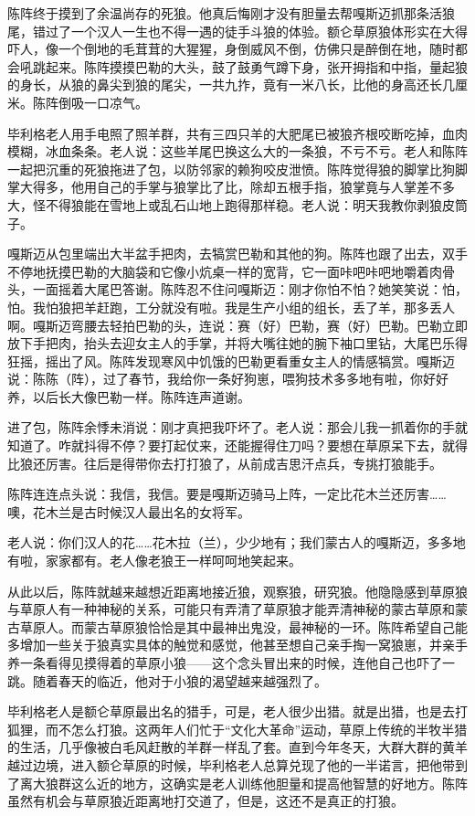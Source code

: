 \par 陈阵终于摸到了余温尚存的死狼。他真后悔刚才没有胆量去帮嘎斯迈抓那条活狼尾，错过了一个汉人一生也不得一遇的徒手斗狼的体验。额仑草原狼体形实在大得吓人，像一个倒地的毛茸茸的大猩猩，身倒威风不倒，仿佛只是醉倒在地，随时都会吼跳起来。陈阵摸摸巴勒的大头，鼓了鼓勇气蹲下身，张开拇指和中指，量起狼的身长，从狼的鼻尖到狼的尾尖，一共九拃，竟有一米八长，比他的身高还长几厘米。陈阵倒吸一口凉气。
\par 毕利格老人用手电照了照羊群，共有三四只羊的大肥尾已被狼齐根咬断吃掉，血肉模糊，冰血条条。老人说：这些羊尾巴换这么大的一条狼，不亏不亏。老人和陈阵一起把沉重的死狼拖进了包，以防邻家的赖狗咬皮泄愤。陈阵觉得狼的脚掌比狗脚掌大得多，他用自己的手掌与狼掌比了比，除却五根手指，狼掌竟与人掌差不多大，怪不得狼能在雪地上或乱石山地上跑得那样稳。老人说：明天我教你剥狼皮筒子。
\par 嘎斯迈从包里端出大半盆手把肉，去犒赏巴勒和其他的狗。陈阵也跟了出去，双手不停地抚摸巴勒的大脑袋和它像小炕桌一样的宽背，它一面咔吧咔吧地嚼着肉骨头，一面摇着大尾巴答谢。陈阵忍不住问嘎斯迈：刚才你怕不怕？她笑笑说：怕，怕。我怕狼把羊赶跑，工分就没有啦。我是生产小组的组长，丢了羊，那多丢人啊。嘎斯迈弯腰去轻拍巴勒的头，连说：赛（好）巴勒，赛（好）巴勒。巴勒立即放下手把肉，抬头去迎女主人的手掌，并将大嘴往她的腕下袖口里钻，大尾巴乐得狂摇，摇出了风。陈阵发现寒风中饥饿的巴勒更看重女主人的情感犒赏。嘎斯迈说：陈陈（阵），过了春节，我给你一条好狗崽，喂狗技术多多地有啦，你好好养，以后长大像巴勒一样。陈阵连声道谢。
\par 进了包，陈阵余悸未消说：刚才真把我吓坏了。老人说：那会儿我一抓着你的手就知道了。咋就抖得不停？要打起仗来，还能握得住刀吗？要想在草原呆下去，就得比狼还厉害。往后是得带你去打打狼了，从前成吉思汗点兵，专挑打狼能手。
\par 陈阵连连点头说：我信，我信。要是嘎斯迈骑马上阵，一定比花木兰还厉害……噢，花木兰是古时候汉人最出名的女将军。
\par 老人说：你们汉人的花……花木拉（兰），少少地有；我们蒙古人的嘎斯迈，多多地有啦，家家都有。老人像老狼王一样呵呵地笑起来。
\par 从此以后，陈阵就越来越想近距离地接近狼，观察狼，研究狼。他隐隐感到草原狼与草原人有一种神秘的关系，可能只有弄清了草原狼才能弄清神秘的蒙古草原和蒙古草原人。而蒙古草原狼恰恰是其中最神出鬼没，最神秘的一环。陈阵希望自己能多增加一些关于狼真实具体的触觉和感觉，他甚至想自己亲手掏一窝狼崽，并亲手养一条看得见摸得着的草原小狼——这个念头冒出来的时候，连他自己也吓了一跳。随着春天的临近，他对于小狼的渴望越来越强烈了。
\par 
\par 毕利格老人是额仑草原最出名的猎手，可是，老人很少出猎。就是出猎，也是去打狐狸，而不怎么打狼。这两年人们忙于“文化大革命”运动，草原上传统的半牧半猎的生活，几乎像被白毛风赶散的羊群一样乱了套。直到今年冬天，大群大群的黄羊越过边境，进入额仑草原的时候，毕利格老人总算兑现了他的一半诺言，把他带到了离大狼群这么近的地方，这确实是老人训练他胆量和提高他智慧的好地方。陈阵虽然有机会与草原狼近距离地打交道了，但是，这还不是真正的打狼。
